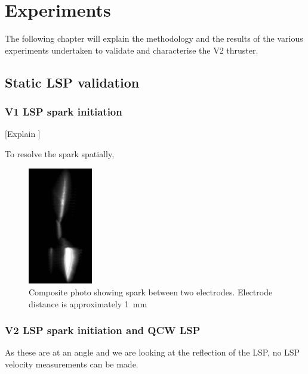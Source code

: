 \chapter{Experiments}

    The following chapter will explain the methodology and the results of the various experiments undertaken to validate and characterise the V2 thruster.

    \section{Static LSP validation}

        \subsection{V1 LSP spark initiation}



            [Explain ]

            To resolve the spark spatially, 

            \begin{figure}[!ht]
                \centering
                \includegraphics[width=0.25\textwidth]{assets/4 experiments/Composite photo spark.png}
                \caption{Composite photo showing spark between two electrodes. Electrode distance is approximately \qty{1}{mm}}
            \end{figure}



        \subsection{V2 LSP spark initiation and QCW LSP}


            As these are at an angle and we are looking at the reflection of the LSP, no LSP velocity measurements can be made.

